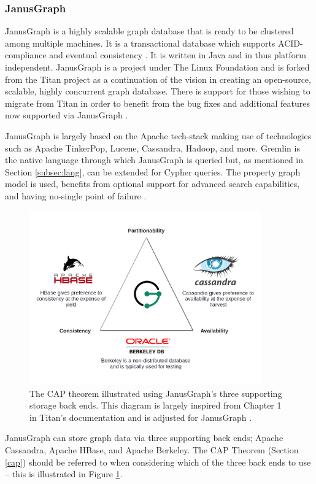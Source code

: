 \subsubsection{JanusGraph}

JanusGraph is a highly scalable graph database that is ready to be clustered among multiple machines. It is a transactional database which supports ACID-compliance and eventual consistency \cite{janusgraph-main}. It is written in Java and in thus platform independent. JanusGraph is a project under The Linux Foundation and is forked from the Titan project as a continuation of the vision in creating an open-source, scalable, highly concurrent graph database. There is support for those wishing to migrate from Titan in order to benefit from the bug fixes and additional features now supported via JanusGraph \cite{janusgraph-titan}.

JanusGraph is largely based on the Apache tech-stack making use of technologies such as Apache TinkerPop, Lucene, Cassandra, Hadoop, and more. Gremlin is the native language through which JanusGraph is queried but, as mentioned in Section \ref{subsec:lang}, can be extended for Cypher queries. The property graph model is used, benefits from optional support for advanced search capabilities, and having no-single point of failure \cite{janusgraph-docs}.

\begin{figure}[h!]
    \centering
    \includegraphics[width=10cm]{img/CAP-JanusGraph.png}
    \caption{The CAP theorem illustrated using JanusGraph's three supporting storage back ends. This diagram is largely inspired from Chapter 1 in Titan's documentation and is adjusted for JanusGraph \cite{titan-cap}.}
    \label{fig:janusgraph-cap}
\end{figure}

JanusGraph can store graph data via three supporting back ends; Apache Cassandra, Apache HBase, and Apache Berkeley. The CAP Theorem (Section \ref{cap}) should be referred to when considering which of the three back ends to use -- this is illustrated in Figure \ref{fig:janusgraph-cap}. 

